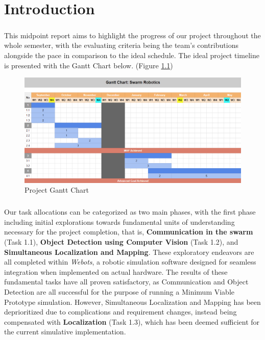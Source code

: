 \chapter{Introduction}

\paragraph*{}
This midpoint report aims to highlight the progress of our project throughout the whole semester, with the evaluating criteria being the team's contributions alongside the pace in comparison to the ideal schedule. The ideal project timeline is presented with the Gantt Chart below. (Figure \ref{fig:gantt-chart})

\begin{figure} [H]
    \centering
    \includegraphics[width=1\linewidth]{assets/images/introduction/gantt_chart.png}
    \caption{Project Gantt Chart}
    \label{fig:gantt-chart}
\end{figure}

\paragraph*{}
Our task allocations can be categorized as two main phases, with the first phase including initial explorations towards fundamental units of understanding necessary for the project completion, that is, \textbf{Communication in the swarm} (Task 1.1), \textbf{Object Detection using Computer Vision} (Task 1.2), and \textbf{Simultaneous Localization and Mapping}. These exploratory endeavors are all completed within \textit{Webots}, a robotic simulation software designed for seamless integration when implemented on actual hardware. The results of these fundamental tasks have all proven satisfactory, as Communication and Object Detection are all successful for the purpose of running a Minimum Viable Prototype simulation. However, Simultaneous Localization and Mapping has been deprioritized due to complications and requirement changes, instead being compensated with \textbf{Localization} (Task 1.3), which has been deemed sufficient for the current simulative implementation.

